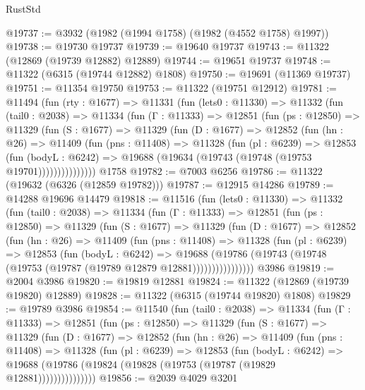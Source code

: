 \begin{lexlean}{RustStd}
\begin{coremodule}
@19737 := @3932 (@1982 (@1994 @1758) (@1982 (@4552 @1758) @1997))
@19738 := @19730 @19737
@19739 := @19640 @19737
@19743 := @11322 (@12869 (@19739 @12882) @12889)
@19744 := @19651 @19737
@19748 := @11322 (@6315 (@19744 @12882) @1808)
@19750 := @19691 (@11369 @19737)
@19751 := @11354 @19750
@19753 := @11322 (@19751 @12912)
@19781 := @11494
    (fun (rty : @1677) =>
    @11331
      (fun (lets0 : @11330) =>
      @11332
        (fun (tail0 : @2038) =>
        @11334
          (fun (Γ : @11333) =>
          @12851
            (fun (ps : @12850) =>
            @11329
              (fun (S : @1677) =>
              @11329
                (fun (D : @1677) =>
                @12852
                  (fun (hn : @26) =>
                  @11409
                    (fun (pns : @11408) =>
                    @11328
                      (fun (pl : @6239) =>
                      @12853
                        (fun (bodyL : @6242) =>
                        @19688 (@19634 (@19743 (@19748 (@19753 @19701)))))))))))))))
    @1758
@19782 := @7003 @6256
@19786 := @11322 (@19632 (@6326 (@12859 @19782)))
@19787 := @12915 @14286
@19789 := @14288 @19696 @14479
@19818 := @11516
    (fun (lets0 : @11330) =>
    @11332
      (fun (tail0 : @2038) =>
      @11334
        (fun (Γ : @11333) =>
        @12851
          (fun (ps : @12850) =>
          @11329
            (fun (S : @1677) =>
            @11329
              (fun (D : @1677) =>
              @12852
                (fun (hn : @26) =>
                @11409
                  (fun (pns : @11408) =>
                  @11328
                    (fun (pl : @6239) =>
                    @12853
                      (fun (bodyL : @6242) =>
                      @19688
                        (@19786
                          (@19743 (@19748 (@19753 (@19787 (@19789 @12879 @12881))))))))))))))))
    @3986
@19819 := @2004 @3986
@19820 := @19819 @12881
@19824 := @11322 (@12869 (@19739 @19820) @12889)
@19828 := @11322 (@6315 (@19744 @19820) @1808)
@19829 := @19789 @3986
@19854 := @11540
    (fun (tail0 : @2038) =>
    @11334
      (fun (Γ : @11333) =>
      @12851
        (fun (ps : @12850) =>
        @11329
          (fun (S : @1677) =>
          @11329
            (fun (D : @1677) =>
            @12852
              (fun (hn : @26) =>
              @11409
                (fun (pns : @11408) =>
                @11328
                  (fun (pl : @6239) =>
                  @12853
                    (fun (bodyL : @6242) =>
                    @19688 (@19786 (@19824 (@19828 (@19753 (@19787 (@19829 @12881)))))))))))))))
@19856 := @2039 @4029 @3201

\end{coremodule}
\end{lexlean}
